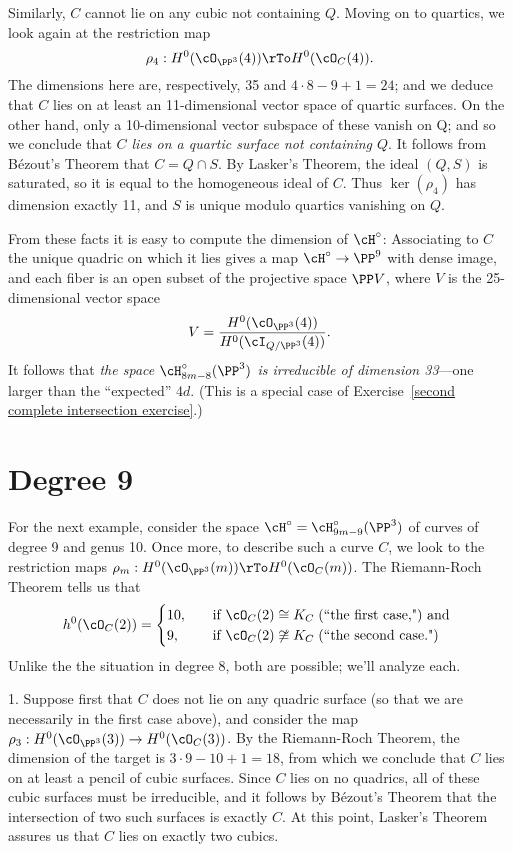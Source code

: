 Similarly, $C$ cannot lie on any cubic not containing $Q$. Moving on to quartics, we look again at the restriction map
$$
\rho_4 : H^0(\cO_{\PP^3}(4)) \rTo H^0(\cO_C(4)).
$$
The dimensions here are, respectively, 35 and $4\cdot 8 - 9 + 1 = 24$; and we deduce that $C$ lies on at least an 11-dimensional vector space of quartic surfaces. On the other hand, only a 10-dimensional vector subspace of these vanish on Q; and so we conclude that \emph{$C$ lies on a quartic surface not containing $Q$}. It follows from B\'ezout's Theorem that $C = Q \cap S$. By Lasker's Theorem, the ideal $(Q,S)$ is saturated, so it is equal to the homogeneous ideal of $C$. Thus $\ker(\rho_4)$ has dimension exactly 11, and  $S$ is unique modulo quartics vanishing on $Q$.

From these facts it is easy to compute the dimension of  $\cH^\circ$: Associating to $C$ the unique quadric on which it lies gives a map $\cH^\circ \to \PP^9$ with dense image, and each fiber is an open subset of the projective space $\PP V$, where $V$ is the 25-dimensional vector space
$$
V = \frac{H^0(\cO_{\PP^3}(4))}{H^0(\cI_{Q/\PP^3}(4))}.
$$
It follows that \emph{the space $\cH^\circ_{8m-8}(\PP^3)$ is irreducible of dimension 33}---one larger than the ``expected'' $4d$.
(This is a special case of Exercise~\ref{second complete intersection exercise}.)

\section{Degree 9}\label{deg9 section}

For the next example, consider the space $\cH^\circ = \cH^\circ_{9m-9}(\PP^3)$ of curves of degree 9 and genus 10. Once more, to describe such a curve $C$, we look to the restriction maps $\rho_m: H^0(\cO_{\PP^3}(m)) \rTo H^0(\cO_C(m))$. The Riemann-Roch Theorem tells us that
\begin{align*}
h^0(\cO_C(2)) =
\begin{cases}
10, \quad &\text{if } \cO_C(2) \cong K_C \; \text{(``the first case,") and } \\
9,  \quad &\text{if } \cO_C(2) \not\cong K_C  \; \text{(``the second case.")}
\end{cases}
\end{align*}
Unlike the the situation in degree 8, both are possible; we'll analyze each.

1. Suppose first that $C$ does not lie on any quadric surface (so that we are necessarily in the first case above), and consider the map $\rho_3 : H^0(\cO_{\PP^3}(3)) \to H^0(\cO_C(3))$. By the Riemann-Roch Theorem, the dimension of the target is $3\cdot 9 - 10 + 1 = 18$, from which we conclude that $C$ lies on at least a pencil of cubic surfaces. Since $C$ lies on no quadrics, all of these cubic surfaces must be irreducible, and it follows by B\'ezout's Theorem that the intersection of two such surfaces is exactly $C$. At this point, Lasker's Theorem assures us that $C$ lies on exactly two cubics.

